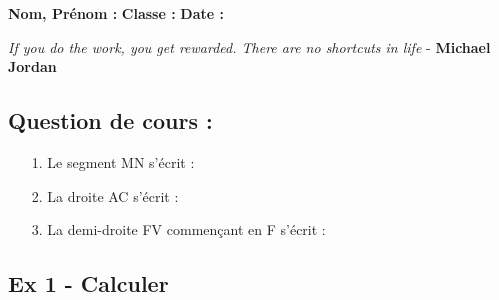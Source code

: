 



\textbf{Nom, Prénom :} \hspace{8cm} \textbf{Classe :} \hspace{3cm} \textbf{Date :}\\
\vspace{-0.8cm}
\begin{center}
  \textit{If you do the work, you get rewarded. There are no shortcuts in life}  - \textbf{Michael Jordan}
\end{center}
\vspace{-0.8cm}

\subsection*{Question de cours :}
  \begin{enumerate}
    \item[1.] Le segment MN s'écrit : \dotfill 
    \item[2.] La droite AC s'écrit : \dotfill 
    \item[3.] La demi-droite FV commençant en F s'écrit : \dotfill 
  \end{enumerate}

  \subsection*{Ex 1 - Calculer}


